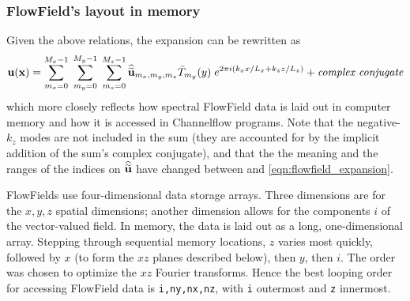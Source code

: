 \documentclass{article}[12pt]
\begin{document}

\subsubsection{FlowField's layout in memory}
\label{sec:flowfield_memory}

Given the above relations, the expansion
 can be rewritten as
\begin{align}
{\bf u}({\bf x}) = \sum_{m_x=0}^{M_x-1} \; \sum_{m_y=0}^{M_y-1} \; \sum_{m_z=0}^{M_z-1}
\widehat{\widetilde{{\bf u}}}_{m_x,m_y,m_z} \bar{T}_{m_y}(y) \; e^{2 \pi i \left(k_x x/L_x + k_z z/L_z \right)} + \text{\em complex conjugate}
\label{eqn:flowfield_expansion}
\end{align}
which more closely reflects how spectral FlowField data is laid out in
computer memory and how it is accessed in Channelflow programs. Note
that the negative-$k_z$ modes are not included in the sum (they are
accounted for by the implicit addition of the sum's complex
conjugate), and that the the meaning and the ranges of the indices on
$\widehat{\widetilde{{\bf u}}}$ have changed between  and
\ref{eqn:flowfield_expansion}.

FlowFields use four-dimensional data storage arrays. Three dimensions
are for the $x,y,z$ spatial dimensions; another dimension allows for
the components $i$ of the vector-valued field. In memory, the data is
laid out as a long, one-dimensional array. Stepping through sequential
memory locations, $z$ varies most quickly, followed by $x$ (to form the
$xz$ planes described below), then $y$, then $i$. The order
was chosen to optimize the $xz$ Fourier transforms. Hence the best looping
order for accessing FlowField data is {\tt i,ny,nx,nz}, with {\tt i} outermost
and {\tt z} innermost.
\end{document}

